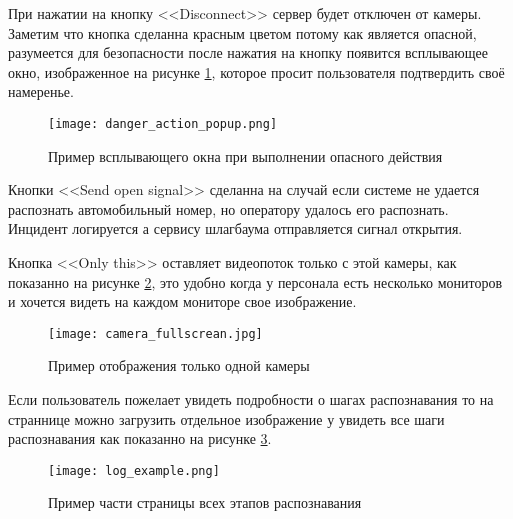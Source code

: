 При нажатии на кнопку <<Disconnect>> сервер будет отключен от камеры. Заметим что кнопка сделанна красным цветом потому как является опасной, разумеется для безопасности после нажатия на кнопку появится всплывающее окно, изображенное на рисунке \ref{sec:user_guide:danger_action_popup}, которое просит пользователя подтвердить своё намеренье. 

\begin{figure}[ht]
  \centering
  \texttt{[image: danger\_action\_popup.png]} 
  \caption{Пример всплывающего окна при выполнении опасного действия} 
  \label{sec:user_guide:danger_action_popup}
\end{figure}

Кнопки <<Send open signal>> сделанна на случай если системе не удается распознать автомобильный номер, но оператору удалось его распознать. Инцидент логируется а сервису шлагбаума отправляется сигнал открытия.

Кнопка <<Only this>> оставляет видеопоток только с этой камеры, как показанно на рисунке \ref{sec:user_guide:only_one_fullscrean}, это удобно когда у персонала есть несколько мониторов и хочется видеть на каждом мониторе свое изображение.

\begin{figure}[ht]
  \centering
  \texttt{[image: camera\_fullscrean.jpg]} 
  \caption{Пример отображения только одной камеры} 
  \label{sec:user_guide:only_one_fullscrean}
\end{figure}

Если пользователь пожелает увидеть подробности о шагах распознавания то на страннице  можно загрузить отдельное изображение у увидеть все шаги распознавания как показанно на рисунке \ref{sec:user_guide:log_example}. 

\begin{figure}[ht]
  \centering
  \texttt{[image: log\_example.png]} 
  \caption{Пример части страницы всех этапов распознавания} 
  \label{sec:user_guide:log_example}
\end{figure}